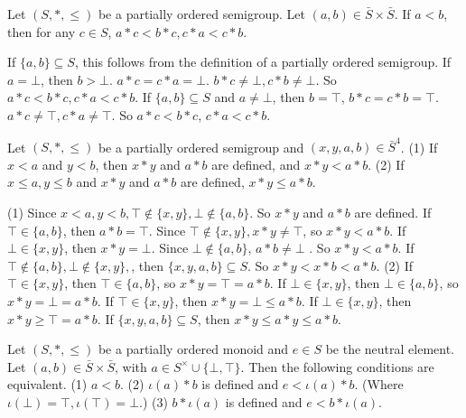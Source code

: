 \begin{propositionenv}
    Let $(S,*,\le)$ be a partially ordered semigroup. Let $(a,b)\in \bar{S}\times \bar{S}$. If $a<b$, then for any $c\in S$, $a*c<b*c,c*a<c*b$.
\end{propositionenv}
\begin{proofenv}
    If $\{a,b\}\subseteq S$, this follows from the definition of a partially ordered semigroup. If $a=\bot$, then $b>\bot$. $a*c=c*a=\bot$. $b*c\not=\bot, c*b\not=\bot$. So $a*c<b*c,c*a<c*b$. If $\{a,b\}\subseteq S$ and $a\not=\bot$, then $b=\top$, $b*c=c*b=\top$. $a*c\not=\top,c*a\not=\top$. So $a*c<b*c$, $c*a<c*b$.
\end{proofenv}
\begin{propositionenv}
    \quad \newline
    Let $(S,*,\le)$  be a partially ordered semigroup and $(x,y,a,b)\in \bar{S}^4$. 
    \newline
    (1) If $x<a$ and $y<b$, then $x*y$ and $a*b$ are defined, and $x*y<a*b$.
    \newline
    (2) If $x\le a, y\le b$ and $x*y$  and $a*b$ are defined, $x*y\le a*b$.
\end{propositionenv}
\begin{proofenv}
    \quad\newline
    (1) Since $x<a,y<b, \top\notin\{x,y\},\bot\notin\{a,b\}$. So $x*y$ and $a*b$ are defined.
    If $\top\in \{a,b\}$, then $a*b=\top$. Since $\top\notin\{x,y\},x*y\not=\top$, so $x*y<a*b$.
    If $\bot\in\{x,y\}$, then $x*y=\bot$. Since $\bot\notin\{a,b\}$, $a*b\not=\bot$ . So $x*y<a*b$.
    If $\top\notin\{a,b\},\bot\notin\{x,y\},$, then $\{x,y,a,b\}\subseteq S$. So $x*y<x*b<a*b$.
    \newline
    (2) If $\top\in\{x,y\}$, then $\top\in \{a,b\}$, so $x*y=\top=a*b$.
    If $\bot\in\{x,y\}$, then $\bot\in\{a,b\}$, so $x*y=\bot=a*b$.
    If $\top\in \{x,y\}$, then $x*y=\bot\le a*b$.
    If $\bot\in\{x,y\}$, then $x*y\ge \top= a*b$.
    If $\{x,y,a,b\}\subseteq S$, then $x*y\le a*y \le a*b$.
\end{proofenv}
\begin{propositionenv}
    Let $(S,*,\le)$ be a partially ordered monoid and $e\in S$ be the neutral element. Let $(a,b)\in \bar{S}\times\bar{S}$, with $a\in S^\times\cup\{\bot,\top\}$. Then the following conditions are equivalent.
    \newline
    (1) $a<b$.
    \newline
    (2) $\iota(a)*b$ is defined and $e<\iota(a)*b$. (Where $\iota(\bot)=\top, \iota(\top)=\bot$.)
    \newline
    (3) $b*\iota(a)$ is defined and $e<b*\iota(a)$.
\end{propositionenv}
